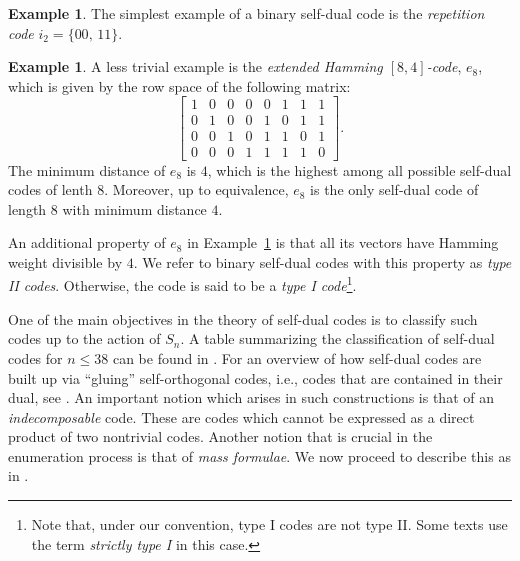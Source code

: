 \documentclass[a4paper,reqno]{amsart}
\theoremstyle{definition}
\newtheorem{example}[theorem]{Example}
\theoremstyle{remark} \newtheorem{remark}[theorem]{Remark}
\numberwithin{equation}{section}
\begin{document}
\begin{example}\label{repetition}
The simplest example of a binary self-dual code is the \emph{repetition code} \(i_2 = \{00, \, 11\}\).
\end{example}

\begin{example}\label{extendedHamming}
A less trivial example is the \emph{extended Hamming \([8,4]\)-code}, \(e_8\), which is given by the row space of the following matrix:
\begin{equation*}
    \begin{bmatrix}
        1 & 0 & 0 & 0 & 0 & 1 & 1 & 1\\
        0 & 1 & 0 & 0 & 1 & 0 & 1 & 1\\
        0 & 0 & 1 & 0 & 1 & 1 & 0 & 1\\
        0 & 0 & 0 & 1 & 1 & 1 & 1 & 0
    \end{bmatrix}.
\end{equation*}
The minimum distance of \(e_8\) is \(4\), which is the highest among all possible self-dual codes of lenth \(8\). Moreover, up to equivalence, \(e_8\) is the only self-dual code of length \(8\) with minimum distance \(4\).
\end{example}

An additional property of \(e_8\) in Example~\ref{extendedHamming} is that all its vectors have Hamming weight divisible by \(4\). We refer to binary self-dual codes with this property as \emph{type II codes}. Otherwise, the code is said to be a \emph{type I code}\footnote{Note that, under our convention, type I codes are not type II. Some texts use the term \emph{strictly type I} in this case.}.  

One of the main objectives in the theory of self-dual codes is to classify such codes up to the action of \(S_n\). A table summarizing the classification of self-dual codes for \(n \leq 38\) can be found in \cite[p.~3]{Bouy12}. For an overview of how self-dual codes are built up via ``gluing'' self-orthogonal codes, i.e., codes that are contained in their dual, see \cite[\S 11]{NRS}. An important notion which arises in such constructions is that of an \emph{indecomposable} code. These are codes which cannot be expressed as a direct product of two nontrivial codes. Another notion that is crucial in the enumeration process is that of \emph{mass formulae}. We now proceed to describe this as in \cite[p.~6]{NRS}.
\end{document}

